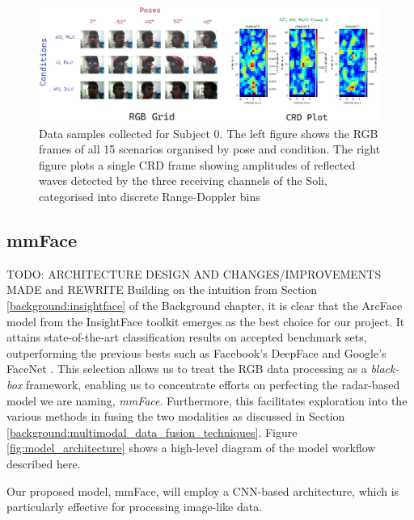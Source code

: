 \documentclass{mpaper}
\begin{document}
\begin{figure}[h]
    \centering
    \includegraphics[width=0.99\textwidth]{figures/rgb_crd_plot.png}
    \vspace{0.2cm}
    \caption{Data samples collected for Subject 0. The left figure shows the RGB frames of all 15 scenarios organised by pose and condition. The right figure plots a single CRD frame showing amplitudes of reflected waves detected by the three receiving channels of the Soli, categorised into discrete Range-Doppler bins}
    \label{fig:rgb_crd_plot}
\end{figure}


\subsection{mmFace}
TODO: ARCHITECTURE DESIGN AND CHANGES/IMPROVEMENTS MADE and REWRITE
Building on the intuition from Section \ref{background:insightface} of the Background chapter, it is clear that the ArcFace model from the InsightFace toolkit emerges as the best choice for our project. It attains state-of-the-art classification results on accepted benchmark sets, outperforming the previous bests such as Facebook's DeepFace \cite{taigman2014deepface} and Google's FaceNet \cite{schroff2015facenet}. This selection allows us to treat the RGB data processing as a \textit{black-box} framework, enabling us to concentrate efforts on perfecting the radar-based model we are naming, \textit{mmFace}. Furthermore, this facilitates exploration into the various methods in fusing the two modalities as discussed in Section \ref{background:multimodal_data_fusion_techniques}. Figure \ref{fig:model_architecture} shows a high-level diagram of the model workflow described here. 

Our proposed model, mmFace, will employ a CNN-based architecture, which is particularly effective for processing image-like data. 
\end{document}
